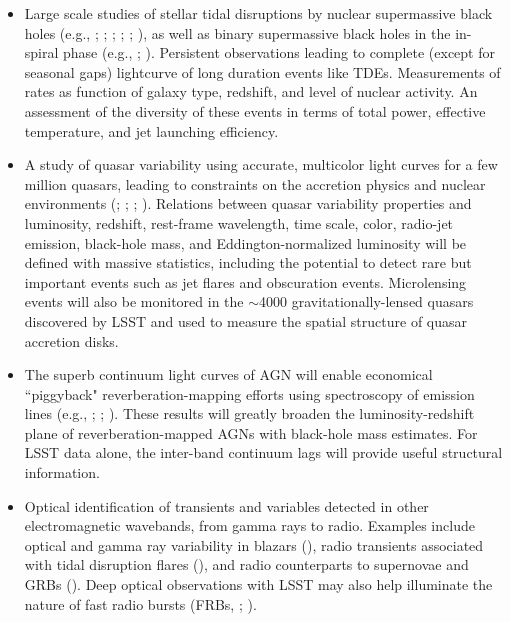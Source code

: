 \begin{itemize}
\item Large scale studies of stellar tidal disruptions by nuclear supermassive
  black holes (e.g., \cite{1989ApJ...346L..13E}; \cite{2008ApJ...676..944G}; \cite{2009MNRAS.400.2070S};
  \cite{2011Sci...333..203B}; \cite{2012EPJWC..3903001G}; \cite{2015JHEAp...7..148K}), as well as binary
  supermassive black holes in the in-spiral phase (e.g., \cite{2009MNRAS.393.1423C};
  \cite{2017MNRAS.465.3840C}). Persistent observations leading to complete (except for
  seasonal gaps) lightcurve of long duration events like
  TDEs. Measurements of rates as function of galaxy type, redshift,
  and level of nuclear activity. An assessment of the diversity
  of these events in terms of total power, effective temperature, and
  jet launching efficiency.


\item A study of quasar variability using accurate, multicolor light
  curves for a few million
quasars, leading to constraints on the accretion physics and nuclear environments (\cite{2003AJ....126.1217D};
\cite{2004ApJ...601..692V}; \cite{2010ApJ...721.1014M}; \cite{2017ApJ...836..186J}). Relations between quasar variability
      properties and luminosity, redshift,
      rest-frame wavelength, time scale, color, radio-jet emission, black-hole
      mass, and Eddington-normalized luminosity will be defined with massive
      statistics, including the potential to detect rare but important events such as
      jet flares and obscuration events. Microlensing events will also be monitored in the $\sim$4000 gravitationally-lensed
      quasars discovered by LSST and used to measure the spatial structure of quasar accretion disks.

\item The superb continuum light curves of AGN will enable economical ``piggyback"
      reverberation-mapping efforts using spectroscopy of emission lines (e.g., \cite{2012ApJ...747...62C};
      \cite{2015ApJS..216....4S}; \cite{2017arXiv171103114G}). These results
      will greatly broaden the luminosity-redshift plane of reverberation-mapped AGNs
      with black-hole mass estimates. For LSST data alone, the inter-band continuum lags
      will provide useful structural information.

\item Optical identification of transients and variables detected in
  other electromagnetic wavebands, from gamma rays to radio. Examples
  include optical and gamma ray variability in blazars (\cite{2014MNRAS.439..690H}),
  radio transients associated with tidal disruption flares
  (\cite{2011MNRAS.416.2102G}), and radio counterparts to supernovae and
  GRBs (\cite{2006ApJ...639..331G}). Deep optical observations with LSST may
  also help illuminate the nature of fast radio bursts (FRBs, \cite{2007Sci...318..777L}; \cite{2013Sci...341...53T}).


\end{itemize}
